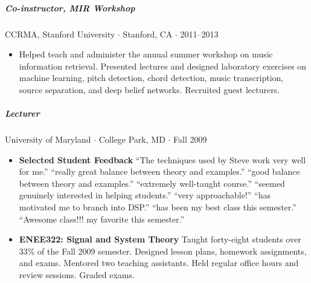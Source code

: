 \documentclass[10pt,letterpaper]{article}
\begin{document}
\subparagraph{Co-instructor, MIR Workshop} CCRMA, Stanford University $\cdot$ Stanford, CA $\cdot$ 2011--2013
\begin{itemize}
    \item Helped teach and administer the annual summer workshop on music information retrieval.  Presented lectures and designed laboratory exercises on machine learning, pitch detection, chord detection, music transcription, source separation, and deep belief networks. Recruited guest lecturers.
\end{itemize}

\subparagraph{Lecturer} University of Maryland $\cdot$ College Park, MD $\cdot$ Fall 2009
\begin{itemize}
    \item \textbf{Selected Student Feedback}  ``The techniques used by Steve work very well for me.'' ``really great balance between theory and examples.'' ``good balance between theory and examples.'' ``extremely well-taught course.'' ``seemed genuinely interested in helping students.'' ``very approachable!'' ``has motivated me to branch into DSP.'' ``has been my best class this semester.'' ``Awesome class!!! my favorite this semester.''
    \item \textbf{ENEE322: Signal and System Theory} Taught forty-eight students over 33\% of the Fall 2009 semester. Designed lesson plans, homework assignments, and exams. Mentored two teaching assistants. Held regular office hours and review sessions. Graded exams.
\end{itemize}
\end{document}
